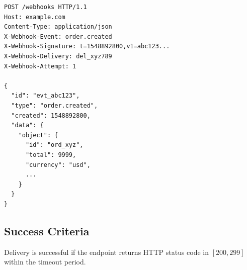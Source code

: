 \begin{lstlisting}[caption=Webhook Request Format]
POST /webhooks HTTP/1.1
Host: example.com
Content-Type: application/json
X-Webhook-Event: order.created
X-Webhook-Signature: t=1548892800,v1=abc123...
X-Webhook-Delivery: del_xyz789
X-Webhook-Attempt: 1

{
  "id": "evt_abc123",
  "type": "order.created",
  "created": 1548892800,
  "data": {
    "object": {
      "id": "ord_xyz",
      "total": 9999,
      "currency": "usd",
      ...
    }
  }
}
\end{lstlisting}

\subsection{Success Criteria}

\begin{definition}
Delivery is successful if the endpoint returns HTTP status code in $[200, 299]$ within the timeout period.
\end{definition}

